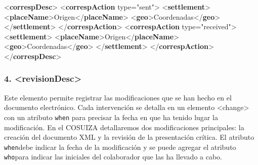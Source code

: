 \documentclass[
]{book}
\newenvironment{Shaded}{\begin{snugshade}}{\end{snugshade}}
\newcommand{\KeywordTok}[1]{\textcolor[rgb]{0.13,0.29,0.53}{\textbf{#1}}}
\newcommand{\NormalTok}[1]{#1}
\newcommand{\OtherTok}[1]{\textcolor[rgb]{0.56,0.35,0.01}{#1}}
\newcommand{\StringTok}[1]{\textcolor[rgb]{0.31,0.60,0.02}{#1}}
\begin{document}
\begin{Shaded}
\begin{Highlighting}[]
\NormalTok{\textless{}}\KeywordTok{correspDesc}\NormalTok{\textgreater{} }
\NormalTok{  \textless{}}\KeywordTok{correspAction}\OtherTok{ type=}\StringTok{"sent"}\NormalTok{\textgreater{} }
\NormalTok{    \textless{}}\KeywordTok{settlement}\NormalTok{\textgreater{}}
\NormalTok{      \textless{}}\KeywordTok{placeName}\NormalTok{\textgreater{}Origen\textless{}/}\KeywordTok{placeName}\NormalTok{\textgreater{}}
\NormalTok{      \textless{}}\KeywordTok{geo}\NormalTok{\textgreater{}Coordenadas\textless{}/}\KeywordTok{geo}\NormalTok{\textgreater{}}
\NormalTok{    \textless{}/}\KeywordTok{settlement}\NormalTok{\textgreater{}}
\NormalTok{  \textless{}/}\KeywordTok{correspAction}\NormalTok{\textgreater{}}
\NormalTok{  \textless{}}\KeywordTok{correspAction}\OtherTok{ type=}\StringTok{"received"}\NormalTok{\textgreater{} }
\NormalTok{    \textless{}}\KeywordTok{settlement}\NormalTok{\textgreater{}}
\NormalTok{      \textless{}}\KeywordTok{placeName}\NormalTok{\textgreater{}Origen\textless{}/}\KeywordTok{placeName}\NormalTok{\textgreater{}}
\NormalTok{      \textless{}}\KeywordTok{geo}\NormalTok{\textgreater{}Coordenadas\textless{}/}\KeywordTok{geo}\NormalTok{\textgreater{}}
\NormalTok{    \textless{}/}\KeywordTok{settlement}\NormalTok{\textgreater{}}
\NormalTok{  \textless{}/}\KeywordTok{correspAction}\NormalTok{\textgreater{}}
\NormalTok{\textless{}/}\KeywordTok{correspDesc}\NormalTok{\textgreater{}}
\end{Highlighting}
\end{Shaded}

\hypertarget{revisiondesc}{%
\subsubsection*{\texorpdfstring{4. { \textless revisionDesc\textgreater{} }}{4.  \textless revisionDesc\textgreater{} }}\label{revisiondesc}}

Este elemento permite registrar las modificaciones que se han hecho en el documento electrónico. Cada intervención se detalla en un elemento { \textless change\textgreater{} } con un atributo \texttt{when} para precisar la fecha en que ha tenido lugar la modificación. En el COSUIZA detallaremos dos modificaciones principales: la creación del documento XML y la revisión de la presentación crítica. El atributo \texttt{when}debe indicar la fecha de la modificación y se puede agregar el atributo \texttt{who}para indicar las iniciales del colaborador que las ha llevado a cabo.
\end{document}
